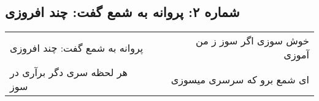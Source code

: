 \begin{center}
\section*{شماره ۲: پروانه به شمع گفت: چند افروزی}
\label{sec:002}
\begin{longtable}{l p{0.5cm} r}
پروانه به شمع گفت: چند افروزی
&&
خوش سوزی اگر سوز ز من آموزی
\\
هر لحظه سری دگر برآری در سوز
&&
ای شمع برو که سرسری میسوزی
\\
\end{longtable}
\end{center}

